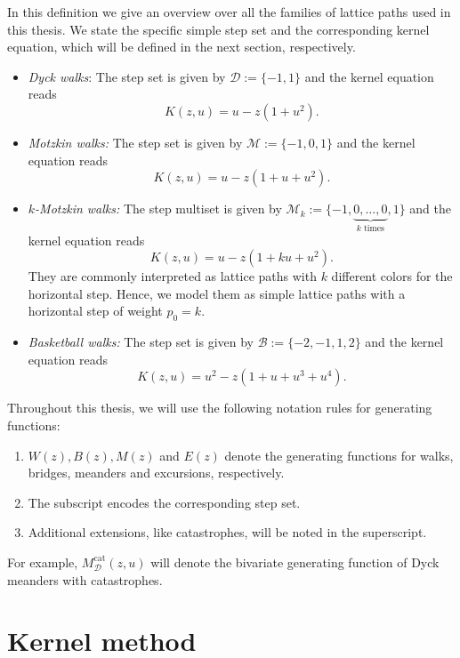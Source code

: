 \begin{definition}
  In this definition we give an overview over all the families of lattice paths used in this thesis. We state the specific simple step set and the corresponding kernel equation, which will be defined in the next section, respectively.
  \begin{itemize}
    \item \textit{Dyck walks}: The step set is given by $\mathcal{D} := \{-1,1\}$ and the kernel equation reads 
    $$
      K(z,u) = u - z(1 + u^2).
    $$
    \item \textit{Motzkin walks:} The step set is given by $\mathcal{M} := \{-1,0,1\}$ and the kernel equation reads 
    $$
      K(z,u) = u - z(1 + u + u^2).
    $$
    \item \textit{$k$-Motzkin walks:} The step multiset is given by $\mathcal{M}_k := \{-1,\underbrace{0,\dots,0}_{k \text{ times}},1\}$ and the kernel equation reads 
    $$
      K(z,u) = u - z(1 + k u + u^2).
    $$
    They are commonly interpreted as lattice paths with $k$ different colors for the horizontal step. Hence, we model them as simple lattice paths with a horizontal step of weight $p_0 = k$.
    \item \textit{Basketball walks:} The step set is given by $\mathcal{B} := \{-2,-1,1,2\}$ and the kernel equation reads 
    $$
      K(z,u) = u^2 - z(1 + u + u^3 + u^4).
    $$
  \end{itemize}
  Throughout this thesis, we will use the following notation rules for generating functions:
  \begin{enumerate}
    \item $W(z), B(z), M(z)$ and $E(z)$ denote the generating functions for walks, bridges, meanders and excursions, respectively.
    \item The subscript encodes the corresponding step set.
    \item Additional extensions, like catastrophes, will be noted in the superscript.
  \end{enumerate}
  For example, $M_{\mathcal{D}}^{\mathrm{cat}}(z,u)$ will denote the bivariate generating function of Dyck meanders with catastrophes.  
\end{definition}

\section{Kernel method}
\label{section:kernel_method}

